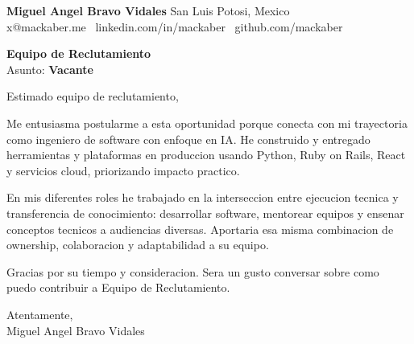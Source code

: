\documentclass[11pt]{article}
\providecommand{\CVProfile}{ai-engineer}
\providecommand{\CompanyName}{Equipo de Reclutamiento}
\providecommand{\RoleTitle}{Vacante}
\newcommand{\ProfileSwitch}[3]{%
    \ifstrequal{\CVProfile}{academic}{#1}{%
        \ifstrequal{\CVProfile}{fullstack-engineer}{#2}{#3}%
    }%
}
\begin{document}
\textbf{Miguel Angel Bravo Vidales} \hfill San Luis Potosi, Mexico\\
x@mackaber.me \textbullet\ linkedin.com/in/mackaber \textbullet\ github.com/mackaber

\vspace{18pt}
\textbf{\CompanyName}\\
Asunto: \textbf{\RoleTitle}

\vspace{14pt}
Estimado equipo de reclutamiento,

\vspace{12pt}
\ProfileSwitch{
Me entusiasma postularme a esta oportunidad porque conecta con mi trayectoria en educacion en computacion, mentoria y trabajo aplicado en IA/ML. He impartido clases de desarrollo de software y fundamentos de nube, y disfruto traducir profundidad tecnica en aprendizaje claro y accionable.
}{
Me entusiasma postularme a esta oportunidad porque conecta con mi trayectoria como ingeniero full-stack. He entregado servicios backend, funcionalidades frontend e integraciones cloud en equipos de producto, priorizando confiabilidad e impacto practico.
}{
Me entusiasma postularme a esta oportunidad porque conecta con mi trayectoria como ingeniero de software con enfoque en IA. He construido y entregado herramientas y plataformas en produccion usando Python, Ruby on Rails, React y servicios cloud, priorizando impacto practico.
}

\vspace{10pt}
En mis diferentes roles he trabajado en la interseccion entre ejecucion tecnica y transferencia de conocimiento: desarrollar software, mentorear equipos y ensenar conceptos tecnicos a audiencias diversas. Aportaria esa misma combinacion de ownership, colaboracion y adaptabilidad a su equipo.

\vspace{10pt}
Gracias por su tiempo y consideracion. Sera un gusto conversar sobre como puedo contribuir a \CompanyName.

\vspace{16pt}
Atentamente,\\
Miguel Angel Bravo Vidales
\end{document}
